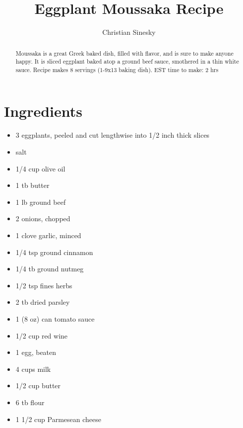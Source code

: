 \documentclass[twoside,letterpaper]{article}
\title{Eggplant Moussaka Recipe}
\author{Christian Sinesky}
\begin{document}
\maketitle
\begin{abstract}
Moussaka is a great Greek baked dish, filled with flavor, and is sure to make anyone happy. It is sliced eggplant baked atop a ground beef sauce, smothered in a thin white sauce.  Recipe makes 8 servings (1-9x13 baking dish). EST time to make: 2 hrs
\end{abstract}
\section{Ingredients}
\begin{itemize}
\itemsep0em 
\item 3 eggplants, peeled and cut lengthwise into 1/2 inch thick slices
\item salt
\item 1/4 cup olive oil
\item 1 tb butter
\item 1 lb ground beef
\item 2 onions, chopped
\item 1 clove garlic, minced
\item 1/4 tsp ground cinnamon 
\item 1/4 tb ground nutmeg 
\item 1/2 tsp fines herbs 
\item 2 tb dried parsley
\item 1 (8 oz) can tomato sauce
\item 1/2 cup red wine
\item 1 egg, beaten
\item 4 cups milk
\item 1/2 cup butter
\item 6 tb flour
\item 1 1/2 cup Parmesean cheese
\end{itemize}
\end{document}
